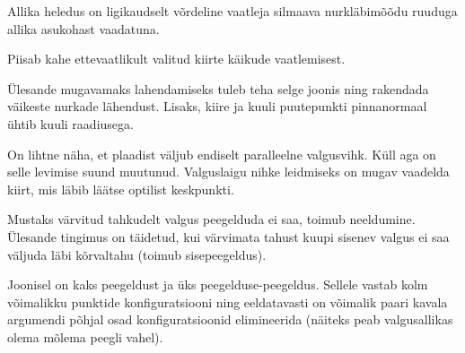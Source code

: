 \documentclass[10pt, twoside]{article}
\begin{document}
{%

\hint
Allika heledus on ligikaudselt võrdeline vaatleja silmaava nurkläbimõõdu ruuduga allika asukohast vaadatuna.
\probend
\bigskip


\hint
Piisab kahe ettevaatlikult valitud kiirte käikude vaatlemisest.
\probend
\bigskip


\hint
Ülesande mugavamaks lahendamiseks tuleb teha selge joonis ning rakendada väikeste nurkade lähendust. Lisaks, kiire ja kuuli puutepunkti pinnanormaal ühtib kuuli raadiusega.
\probend
\bigskip


\hint
On lihtne näha, et plaadist väljub endiselt paralleelne valgusvihk. Küll aga on selle levimise suund muutunud. Valguslaigu nihke leidmiseks on mugav vaadelda kiirt, mis läbib läätse optilist keskpunkti.
\probend
\bigskip


\hint
Mustaks värvitud tahkudelt valgus peegelduda ei saa, toimub neeldumine. Ülesande tingimus on täidetud, kui värvimata tahust kuupi sisenev valgus ei saa
väljuda läbi kõrvaltahu (toimub sisepeegeldus).
\probend
\bigskip


\hint
Joonisel on kaks peegeldust ja üks peegelduse-peegeldus. Sellele vastab kolm võimalikku punktide konfiguratsiooni ning eeldatavasti on võimalik paari kavala argumendi põhjal osad konfiguratsioonid elimineerida (näiteks peab valgusallikas olema mõlema peegli vahel).
\probend
\bigskip


}
\end{document}
